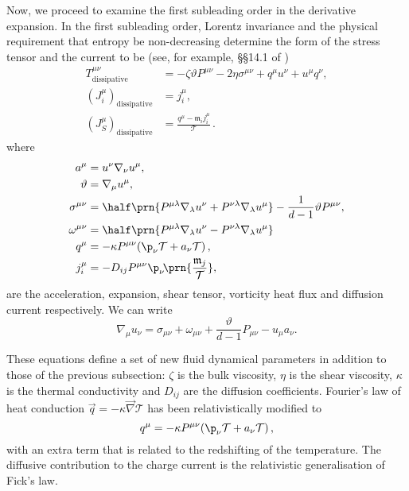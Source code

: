\documentclass[12pt]{article}
\newcommand{\tloc}{\mathcal{T}}
\newcommand{\ml}{\mathfrak{m}}
\newcommand{\diss}{_\text{dissipative}}
\begin{document}
Now, we proceed to examine the first subleading order in the derivative expansion. In the first subleading order, Lorentz invariance and the physical requirement that entropy be non-decreasing determine the form of the stress tensor and the current to be (see, for example, \S\S14.1 of \cite{Andersson:2006nr})
%
\begin{equation}\label{extraTvisc:eq}
\begin{split}
  T^{\mu\nu}\diss &= -\zeta \vartheta P^{\mu\nu} -
  2\eta\sigma^{\mu\nu} + q^\mu u^\nu + u^\mu q^\nu,\\
 (J^\mu_i)\diss &= j^\mu_{i},\\
(J^\mu_S)\diss &= \frac{q^\mu-\ml_i j^\mu_{i}}{\tloc}\,.
\end{split}
\end{equation}
%
where
%
\begin{equation}\label{fluidtensors:eq}
\begin{split}
  a^\mu &= u^\nu \nabla_\nu u^\mu, \\
  \vartheta &= \nabla_\mu u^\mu, \\
  \sigma^{\mu\nu} &= \half \prn{P^{\mu\lambda} \nabla_\lambda u^\nu
                   + P^{\nu\lambda} \nabla_\lambda u^\mu}
                   - \frac{1}{d-1} \vartheta P^{\mu\nu}, \\
  \omega^{\mu\nu} &= \half \prn{P^{\mu\lambda} \nabla_\lambda u^\nu
                   - P^{\nu\lambda} \nabla_\lambda u^\mu} \\
 q^\mu &= -\kappa P^{\mu\nu} (\p_\nu\tloc + a_\nu\tloc)\,, \\
 j^\mu_{i}
   & = - D_{ij} P^{\mu\nu}\p_\nu\! \prn{\frac{\ml_j}{\tloc}},
\end{split}
\end{equation}
%
are the acceleration, expansion, shear tensor, vorticity
heat flux and diffusion current respectively.
We can write
%
\begin{equation}\label{velder:eq}
  \nabla_\mu u_\nu = \sigma_{\mu\nu}+\omega_{\mu\nu}+\frac{\vartheta}{d-1}P_{\mu\nu}-u_\mu a_\nu.
\end{equation}
%


These equations define a set of new fluid dynamical parameters in addition to those of the previous subsection: $\zeta$ is the bulk viscosity, $\eta$ is the shear viscosity, $\kappa$ is the thermal conductivity and $D_{ij}$ are the diffusion coefficients. Fourier's law of heat conduction $\vec{q} = -\kappa \vec{\nabla} \tloc$ has been relativistically modified to
%
\begin{equation}\label{heatcond:eq}
  q^\mu = -\kappa P^{\mu\nu} (\p_\nu\tloc + a_\nu\tloc)\,,
\end{equation}
%
with an extra term that is related to the redshifting of the temperature. The diffusive contribution to the charge current is the relativistic generalisation of Fick's law.
\end{document}
